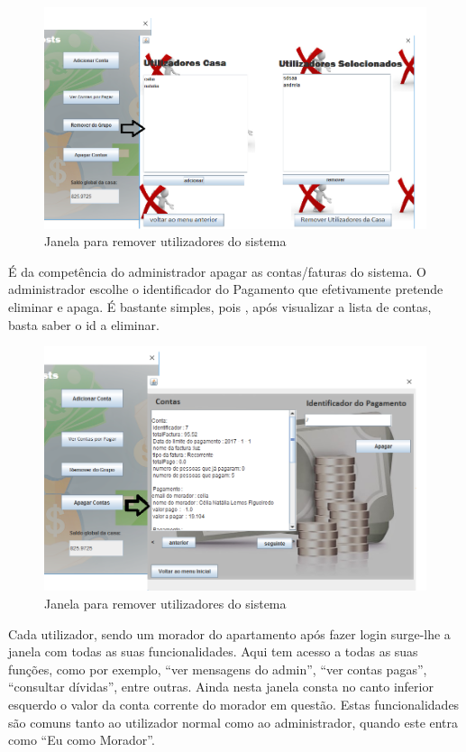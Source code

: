 \begin{figure}[h!]
	\centering
	\includegraphics[scale=0.5]{imagens/interface/removerdogrupoadmin}  
	\caption{Janela para remover utilizadores do sistema}  
\end{figure}

É da competência do administrador apagar as contas/faturas do sistema. O administrador escolhe o identificador do Pagamento que efetivamente pretende eliminar e apaga. É bastante simples, pois , após visualizar a lista de contas, basta saber o id a eliminar. 

\begin{figure}[h!]
	\centering
	\includegraphics[scale=0.5]{imagens/interface/apagarcontasadmin}  
	\caption{Janela para remover utilizadores do sistema}  
\end{figure}

\newpage
Cada utilizador, sendo um morador do apartamento após fazer login surge-lhe a janela com todas as suas funcionalidades.
Aqui tem acesso a todas as suas funções, como por exemplo, “ver mensagens do admin”, “ver contas pagas”, “consultar dívidas”,  entre outras. Ainda nesta janela consta no canto inferior esquerdo o valor da conta corrente do morador em questão. Estas funcionalidades são comuns tanto ao utilizador normal como ao administrador, quando este entra como “Eu como Morador”. 



